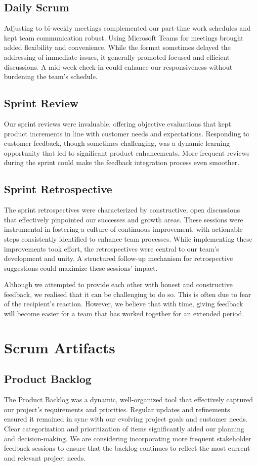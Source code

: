 \subsection{Daily Scrum}
Adjusting to bi-weekly meetings complemented our part-time work schedules and kept team communication robust.
Using Microsoft Teams for meetings brought added flexibility and convenience.
While the format sometimes delayed the addressing of immediate issues, it generally promoted focused and efficient discussions.
A mid-week check-in could enhance our responsiveness without burdening the team's schedule.

\subsection{Sprint Review}
Our sprint reviews were invaluable, offering objective evaluations that kept product increments in line with customer needs and expectations.
Responding to customer feedback, though sometimes challenging, was a dynamic learning opportunity that led to significant product enhancements.
More frequent reviews during the sprint could make the feedback integration process even smoother.

\subsection{Sprint Retrospective}
The sprint retrospectives were characterized by constructive, open discussions that effectively pinpointed our successes and growth areas.
These sessions were instrumental in fostering a culture of continuous improvement, with actionable steps consistently identified to enhance team processes.
While implementing these improvements took effort, the retrospectives were central to our team's development and unity.
A structured follow-up mechanism for retrospective suggestions could maximize these sessions' impact.

Although we attempted to provide each other with honest and constructive feedback, we realised that it can be challenging to do so.
This is often due to fear of the recipient's reaction.
However, we believe that with time, giving feedback will become easier for a team that has worked together for an extended period.


\section{Scrum Artifacts}

\subsection{Product Backlog}
The Product Backlog was a dynamic, well-organized tool that effectively captured our project's requirements and priorities.
Regular updates and refinements ensured it remained in sync with our evolving project goals and customer needs.
Clear categorization and prioritization of items significantly aided our planning and decision-making.
We are considering incorporating more frequent stakeholder feedback sessions to ensure that the backlog continues to reflect the most current and relevant project needs.

